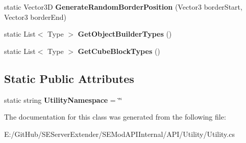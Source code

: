 \begin{DoxyCompactItemize}
\item 
\hypertarget{class_s_e_mod_a_p_i_internal_1_1_a_p_i_1_1_utility_1_1_utility_functions_a875f5ad69bbf8ce1b5d0b57dd4c3d00e}{}static Vector3\+D {\bfseries Generate\+Random\+Border\+Position} (Vector3 border\+Start, Vector3 border\+End)\label{class_s_e_mod_a_p_i_internal_1_1_a_p_i_1_1_utility_1_1_utility_functions_a875f5ad69bbf8ce1b5d0b57dd4c3d00e}

\item 
\hypertarget{class_s_e_mod_a_p_i_internal_1_1_a_p_i_1_1_utility_1_1_utility_functions_abe5f0ba495b1c2a6bc781972b45f902a}{}static List$<$ Type $>$ {\bfseries Get\+Object\+Builder\+Types} ()\label{class_s_e_mod_a_p_i_internal_1_1_a_p_i_1_1_utility_1_1_utility_functions_abe5f0ba495b1c2a6bc781972b45f902a}

\item 
\hypertarget{class_s_e_mod_a_p_i_internal_1_1_a_p_i_1_1_utility_1_1_utility_functions_a76912f148b0c5968a539a31c8f2b92ce}{}static List$<$ Type $>$ {\bfseries Get\+Cube\+Block\+Types} ()\label{class_s_e_mod_a_p_i_internal_1_1_a_p_i_1_1_utility_1_1_utility_functions_a76912f148b0c5968a539a31c8f2b92ce}

\end{DoxyCompactItemize}
\subsection*{Static Public Attributes}
\begin{DoxyCompactItemize}
\item 
\hypertarget{class_s_e_mod_a_p_i_internal_1_1_a_p_i_1_1_utility_1_1_utility_functions_ae5b2b779b3a8115b121bdaf693b9b60e}{}static string {\bfseries Utility\+Namespace} = \char`\"{}\char`\"{}\label{class_s_e_mod_a_p_i_internal_1_1_a_p_i_1_1_utility_1_1_utility_functions_ae5b2b779b3a8115b121bdaf693b9b60e}

\end{DoxyCompactItemize}


The documentation for this class was generated from the following file\+:\begin{DoxyCompactItemize}
\item 
E\+:/\+Git\+Hub/\+S\+E\+Server\+Extender/\+S\+E\+Mod\+A\+P\+I\+Internal/\+A\+P\+I/\+Utility/Utility.\+cs\end{DoxyCompactItemize}
